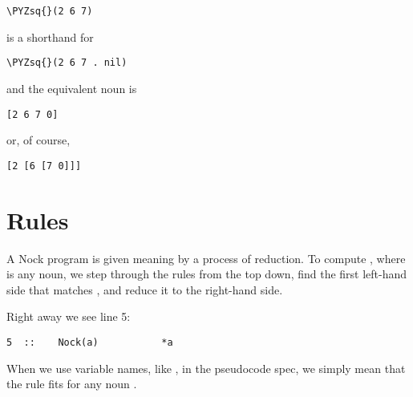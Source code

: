 \begin{framed_shaded}
\begin{Verbatim}[fontsize=\relsize{-2.5},fontseries=b,commandchars=\\\{\}]
\PYZsq{}(2 6 7)
\end{Verbatim}
\end{framed_shaded}
is a shorthand for

\begin{framed_shaded}
\begin{Verbatim}[fontsize=\relsize{-2.5},fontseries=b,commandchars=\\\{\}]
\PYZsq{}(2 6 7 . nil)
\end{Verbatim}
\end{framed_shaded}
and the equivalent noun is

\begin{framed_shaded}
\begin{Verbatim}[fontsize=\relsize{-2.5},fontseries=b,commandchars=\\\{\}]
[2 6 7 0]
\end{Verbatim}
\end{framed_shaded}
or, of course,

\begin{framed_shaded}
\begin{Verbatim}[fontsize=\relsize{-2.5},fontseries=b,commandchars=\\\{\}]
[2 [6 [7 0]]]
\end{Verbatim}
\end{framed_shaded}

\section{Rules}

A Nock program is given meaning by a process of reduction.  To compute
, where  is any noun, we step through the rules from
the top down, find the first left-hand side that matches , and
reduce it to the right-hand side.

Right away we see line 5:

\begin{framed_shaded}
\begin{Verbatim}[fontsize=\relsize{-2.5},fontseries=b,commandchars=\\\{\}]
5  ::    Nock(a)           *a
\end{Verbatim}
\end{framed_shaded}
When we use variable names, like , in the pseudocode spec, we
simply mean that the rule fits for any noun .

